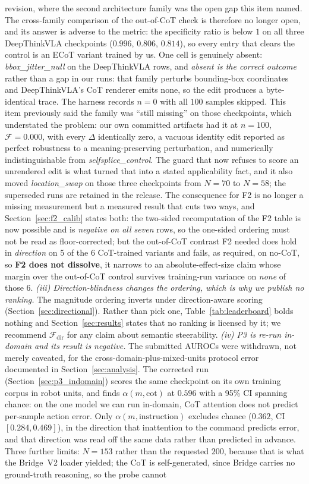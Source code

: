 \documentclass{article}
\begin{document}
revision, where the second architecture family was the open gap this item named. The cross-family comparison of the out-of-CoT check is therefore no longer open, and its answer is adverse to the metric: the specificity ratio is below $1$ on all three DeepThinkVLA checkpoints ($0.996$, $0.806$, $0.814$), so every entry that clears the control is an ECoT variant trained by us. One cell is genuinely absent: \emph{bbox\_jitter\_null} on the DeepThinkVLA rows, and \emph{absent is the correct outcome} rather than a gap in our runs: that family perturbs bounding-box coordinates and DeepThinkVLA's CoT renderer emits none, so the edit produces a byte-identical trace. The harness records $n{=}0$ with all $100$ samples skipped. This item previously said the family was ``still missing'' on those checkpoints, which understated the problem: our own committed artifacts had it at $n{=}100$, $\mathcal{F}=0.000$, with every $\Delta$ identically zero, a vacuous identity edit reported as perfect robustness to a meaning-preserving perturbation, and numerically indistinguishable from \emph{selfsplice\_control}. The guard that now refuses to score an unrendered edit is what turned that into a stated applicability fact, and it also moved \emph{location\_swap} on those three checkpoints from $N{=}70$ to $N{=}58$; the superseded runs are retained in the release. The consequence for F2 is no longer a missing measurement but a measured result that cuts two ways, and Section~\ref{sec:f2_calib} states both: the two-sided recomputation of the F2 table is now possible and is \emph{negative on all seven} rows, so the one-sided ordering must not be read as floor-corrected; but the out-of-CoT contrast F2 needed does hold in \emph{direction} on 5 of the 6 CoT-trained variants and fails, as required, on no-CoT, so \textbf{F2 does not dissolve}, it narrows to an absolute-effect-size claim whose margin over the out-of-CoT control survives training-run variance on \emph{none} of those 6. \emph{(iii) Direction-blindness changes the ordering, which is why we publish no ranking.} The magnitude ordering inverts under direction-aware scoring (Section~\ref{sec:directional}). Rather than pick one, Table~\ref{tab:leaderboard} bolds nothing and Section~\ref{sec:results} states that no ranking is licensed by it; we recommend $\mathcal{F}_{\text{dir}}$ for any claim about semantic steerability. \emph{(iv) P3 is re-run in-domain and its result is negative.} The submitted AUROCs were withdrawn, not merely caveated, for the cross-domain-plus-mixed-units protocol error documented in Section~\ref{sec:analysis}. The corrected run (Section~\ref{sec:p3_indomain}) scores the same checkpoint on its own training corpus in robot units, and finds $\alpha(m,\text{cot})$ at $0.596$ with a 95\% CI spanning chance: on the one model we can run in-domain, CoT attention does not predict per-sample action error. Only $\alpha(m,\text{instruction})$ excludes chance ($0.362$, CI $[0.284, 0.469]$), in the direction that inattention to the command predicts error, and that direction was read off the same data rather than predicted in advance. Three further limits: $N{=}153$ rather than the requested $200$, because that is what the Bridge~V2 loader yielded; the CoT is self-generated, since Bridge carries no ground-truth reasoning, so the probe cannot 
\end{document}
